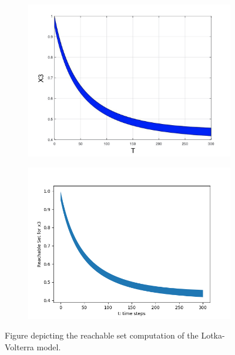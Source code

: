 \documentclass[EPiC]{easychair}
\begin{document}
\begin{figure}[h]
    \hspace{-12ex}
    \begin{subfigure}{0.6\textwidth}
    \centering
    \includegraphics[width=1.15\textwidth]{SapoFigures/LV/SapoLV_X3.jpg}
    \end{subfigure}
    \begin{subfigure}{0.6\textwidth}
    \centering
    \includegraphics[width=1.14\textwidth]{SapoFigures/LV/KaaLV_X3.png}
    \end{subfigure}
    
    \caption{Figure depicting the reachable set computation of the Lotka-Volterra model.} 
    \label{fig3}
\end{figure}
\end{document}
